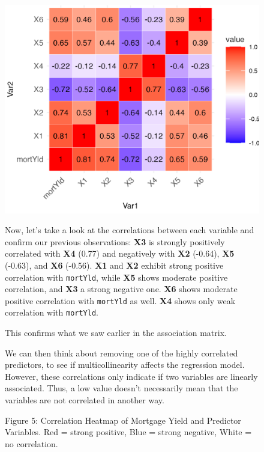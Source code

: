 \documentclass[
  12pt,
]{article}
\begin{document}
\begin{figure}[H]
\centering
\begin{minipage}{0.39\textwidth}
\includegraphics[width=\linewidth]{figures/Figure 5.png}
\captionsetup{font=normalsize}
\caption*{Figure 5: Correlation Heatmap of Mortgage Yield and Predictor Variables. Red = strong positive, Blue = strong negative, White = no correlation.}
\end{minipage}
\hfill
\begin{minipage}{0.59\textwidth}
\vspace{-1cm}
Now, let's take a look at the correlations between each variable and confirm our previous observations:
\textbf{X3} is strongly positively correlated with \textbf{X4} (0.77) and negatively with \textbf{X2} (-0.64), \textbf{X5} (-0.63), and \textbf{X6} (-0.56).
\textbf{X1} and \textbf{X2} exhibit strong positive correlation with \texttt{mortYld}, while \textbf{X5} shows moderate positive correlation, and \textbf{X3} a strong negative one. \textbf{X6} shows moderate positive correlation with \texttt{mortYld} as well. \textbf{X4} shows only weak correlation with \texttt{mortYld}.


This confirms what we saw earlier in the association matrix.

We can then think about removing one of the highly correlated
predictors, to see if multicollinearity affects the regression model.
However, these correlations only indicate if two variables are linearly
associated. Thus, a low value doesn't necessarily mean that the
variables are not correlated in another way.
\end{minipage}
\end{figure}
\end{document}
